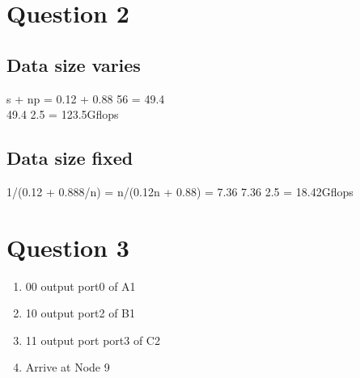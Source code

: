 \documentclass[11pt]{article}
\begin{document}
\section{Question 2}
\label{sec:orgf755713}
\subsection{Data size varies}
\label{sec:org5229c38}
s + np = 0.12 + 0.88 \texttimes{} 56 = 49.4 \\
49.4 \texttimes{} 2.5 = 123.5Gflops
\subsection{Data size fixed}
\label{sec:org7ca0f5c}
1/(0.12 + 0.888/n) = n/(0.12n + 0.88) =  7.36
7.36 \texttimes{} 2.5 = 18.42Gflops

\section{Question 3}
\label{sec:orgc36ad8c}
\begin{enumerate}
\item 00 output port0 of  A1
\item 10 output  port2 of B1
\item 11 output port port3 of C2
\item Arrive at Node 9
\end{enumerate}
\end{document}
